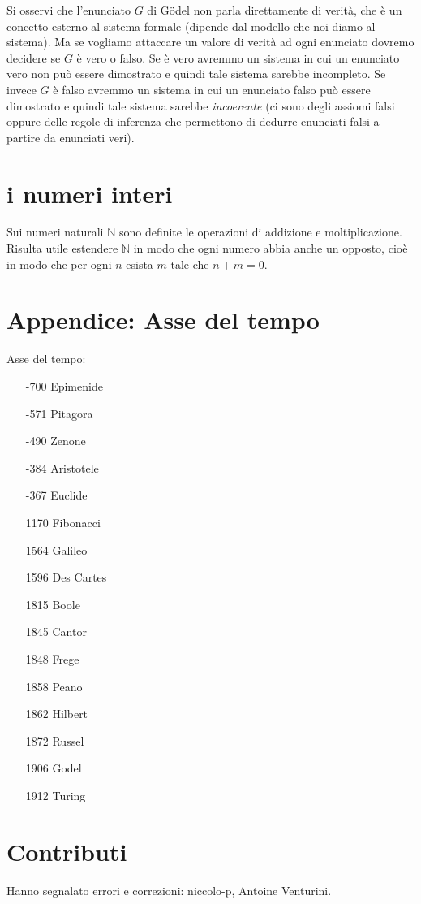 \documentclass[italian,a4paper,hidelinks,headinclude]{scrartcl}
\newcommand{\NN}{{\mathbb N}}
\newcommand{\myemph}[1]{\emph{#1}\marginpar{#1}}
\begin{document}
Si osservi che l'enunciato $G$ di G\"odel non parla direttamente di verità,
che è un concetto esterno al sistema formale
(dipende dal modello che noi diamo al sistema).
Ma se vogliamo attaccare un valore di verità ad ogni enunciato dovremo decidere
se $G$ è vero o falso. Se è vero avremmo un sistema in cui un enunciato vero
non può essere dimostrato e quindi tale sistema sarebbe incompleto.
Se invece $G$ è falso avremmo un sistema in cui un enunciato falso può essere
dimostrato e quindi tale sistema sarebbe \myemph{incoerente} (ci sono degli assiomi
falsi oppure delle regole di inferenza che permettono di dedurre enunciati falsi
a partire da enunciati veri).

\section{i numeri interi}

Sui numeri naturali $\NN$ sono definite le operazioni di addizione e moltiplicazione.
Risulta utile estendere $\NN$ in modo che ogni numero abbia anche un opposto, cioè in modo che per ogni $n$ esista $m$ tale che $n+m=0$.

\section{Appendice: Asse del tempo}
Asse del tempo:
\begin{itemize}
\item[-700] Epimenide
\item[-571] Pitagora
\item[-490] Zenone
\item[-384] Aristotele
\item[-367] Euclide
\item[1170] Fibonacci
\item[1564] Galileo
\item[1596] Des Cartes
\item[1815] Boole
\item[1845] Cantor
\item[1848] Frege
\item[1858] Peano
\item[1862] Hilbert
\item[1872] Russel
\item[1906] Godel
\item[1912] Turing
\end{itemize}

\section{Contributi}

Hanno segnalato errori e correzioni:
niccolo-p,
Antoine Venturini.
\end{document}
